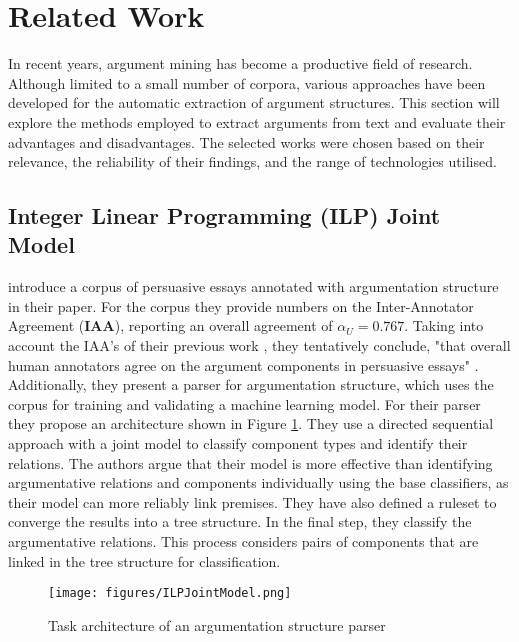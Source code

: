 \section{Related Work}
In recent years, argument mining has become a productive field of research. Although limited to a small number of corpora, various approaches have been developed for the automatic extraction of argument structures. This section will explore the methods employed to extract arguments from text and evaluate their advantages and disadvantages. The selected works were chosen based on their relevance, the reliability of their findings, and the range of technologies utilised.
\subsection{ Integer Linear Programming (\textbf{ILP}) Joint Model } \label{sec:ILP}
\textcite{ParsingArgumentationStructures} introduce a corpus of persuasive essays annotated with argumentation structure in their paper. For the corpus they provide numbers on the Inter-Annotator Agreement (\textbf{IAA}), reporting an overall agreement of \(\alpha_U = 0.767\). Taking into account the IAA's of their previous work \parencite{stab-gurevych-2014-identifying}, they tentatively conclude, "that overall human annotators agree on the argument components in persuasive essays" \parencite{ParsingArgumentationStructures}. Additionally, they present a parser for argumentation structure, which uses the corpus for training and validating a machine learning model.  For their parser they propose an architecture shown in Figure \ref{fig:IlpJointModel}. They use a directed sequential approach with a joint model to classify component types and identify their relations. The authors argue that their model is more effective than identifying argumentative relations and components individually using the base classifiers, as their model can more reliably link premises. They have also defined a ruleset to converge the results into a tree structure. In the final step, they classify the argumentative relations. This process considers pairs of components that are linked in the tree structure for classification.
\begin{figure}
    \centering
    \texttt{[image: figures/ILPJointModel.png]}
    \caption{Task architecture of an argumentation structure parser \parencite{ParsingArgumentationStructures}}
    \label{fig:IlpJointModel}
\end{figure}

